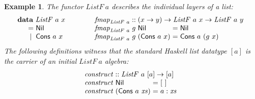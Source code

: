 \documentclass{jfp1}
\newtheorem{example}{Example}
\newcommand{\kw}[1]{\textbf{#1}}
\begin{document}
\begin{example}
  The functor $\mathit{ListF}~a$ describes the individual layers of a
  list:
  \begin{displaymath}
    \begin{array}{@{}l@{\hspace{3em}}l}
      \begin{array}{l}
        \kw{data}~\mathit{ListF}~a~x \\
        \quad
        \begin{array}{c@{\hspace{0.3em}}l}
          = & \mathsf{Nil} \\
          | & \mathsf{Cons}~a~x
        \end{array}
      \end{array}
      &
      \begin{array}{l}
        \mathit{fmap}_{\mathit{ListF}~a} :: (x \to y) \to \mathit{ListF}~a~x \to \mathit{ListF}~a~y \\
        \begin{array}{@{}l@{\hspace{0.3em}}l@{\hspace{0.3em}}l@{\hspace{0.3em}}c@{\hspace{0.3em}}l}
          \mathit{fmap}_{\mathit{ListF}~a}&g&\mathsf{Nil} &=& \mathsf{Nil} \\
          \mathit{fmap}_{\mathit{ListF}~a}&g&(\mathsf{Cons}~a~x) &=& \mathsf{Cons}~a~(g~x)
        \end{array}
      \end{array}
    \end{array}
  \end{displaymath}
  The following definitions witness that the standard Haskell list datatype
  $[a]$ is the carrier of an initial $\mathit{ListF}~a$ algebra:
  \begin{displaymath}
    \begin{array}{l}
      \mathit{construct} :: \mathit{ListF}~a~[a] \to [a] \\
      \begin{array}{@{}l@{\hspace{0.3em}}l@{\hspace{0.3em}}c@{\hspace{0.3em}}l}
        \mathit{construct}&\mathsf{Nil} &=& [~] \\
        \mathit{construct}&(\mathsf{Cons}~a~\mathit{xs}) &=& a : \mathit{xs}
      \end{array}

\end{array}
\end{displaymath}
\end{example}
\end{document}
